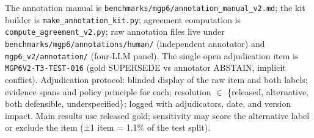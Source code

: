 The annotation manual is
\texttt{benchmarks/mgp6/annotation\_manual\_v2.md}; the kit builder is
\texttt{make\_annotation\_kit.py}; agreement computation is
\texttt{compute\_agreement\_v2.py}; raw annotation files live under
\texttt{benchmarks/mgp6/annotations/human/} (independent annotator) and
\texttt{mgp6\_v2/annotation/} (four-LLM panel). The single open
adjudication item is \texttt{MGP6V2-T3-TEST-016} (gold SUPERSEDE vs
annotator ABSTAIN, implicit conflict). Adjudication protocol: blinded
display of the raw item and both labels; evidence spans and policy
principle for each; resolution \ensuremath{\in} \{released, alternative, both
defensible, underspecified\}; logged with adjudicators, date, and
version impact. Main results use released gold; sensitivity may score
the alternative label or exclude the item (±1 item = 1.1\% of the test
split).
